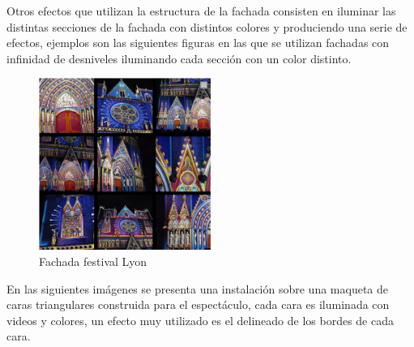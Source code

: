 Otros efectos que utilizan la estructura de la fachada consisten en iluminar las distintas secciones de la fachada con distintos colores y produciendo una serie de efectos, ejemplos son las siguientes figuras en las que se utilizan fachadas con infinidad de desniveles iluminando cada sección con un color distinto.
\begin{figure}[H]
  \centering
    \includegraphics[width=0.5\textwidth]{./Cap1_intro/Fachada1.png}
  \caption[http://www.weltlighting.com/]{Fachada festival Lyon}
  \label{fig:Fachada1}
\end{figure}

En las siguientes imágenes se presenta una instalación sobre una maqueta de caras triangulares construida para el espectáculo, cada cara es iluminada con videos y colores, un efecto muy utilizado es el delineado de los bordes de cada cara.

